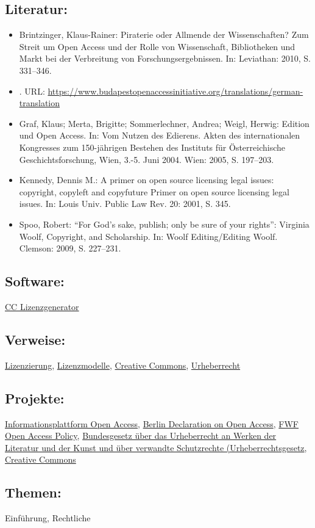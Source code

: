 \documentclass{article}
\begin{document}
        \subsection*{Literatur:}\begin{itemize}\item Brintzinger, Klaus-Rainer: Piraterie oder Allmende der Wissenschaften? Zum Streit um Open Access und der Rolle von Wissenschaft,  Bibliotheken und Markt bei der Verbreitung von  Forschungsergebnissen. In: Leviathan: 2010, S. 331–346.\item . URL: \url{https://www.budapestopenaccessinitiative.org/translations/german-translation}\item Graf, Klaus; Merta, Brigitte; Sommerlechner, Andrea; Weigl, Herwig: Edition und Open Access. In: Vom Nutzen des Edierens. Akten des internationalen Kongresses zum 150-jährigen Bestehen des Instituts für Österreichische Geschichtsforschung, Wien, 3.-5. Juni 2004. Wien: 2005, S. 197–203.\item Kennedy, Dennis M.: A primer on open source licensing legal issues: copyright, copyleft and copyfuture Primer on open source licensing legal issues. In: Louis Univ. Public Law Rev. 20: 2001, S. 345.\item Spoo, Robert: “For God’s sake, publish; only be sure of your rights”: Virginia Woolf, Copyright, and Scholarship. In: Woolf Editing/Editing Woolf. Clemson: 2009, S. 227–231.\end{itemize}\subsection*{Software:}\href{Vectr}{CC Lizenzgenerator}\subsection*{Verweise:}\href{https://gams.uni-graz.at/o:konde.119}{Lizenzierung}, \href{https://gams.uni-graz.at/o:konde.9}{Lizenzmodelle}, \href{https://gams.uni-graz.at/o:konde.45}{Creative Commons}, \href{https://gams.uni-graz.at/o:konde.44}{Urheberrecht}\subsection*{Projekte:}\href{https://open-access.net/}{Informationsplattform Open Access}, \href{http://www.berlin9.org/about/declaration/}{Berlin Declaration on Open Access}, \href{https://www.fwf.ac.at/de/forschungsfoerderung/open-access-policy/}{FWF Open Access Policy}, \href{https://www.ris.bka.gv.at/GeltendeFassung.wxe?Abfrage=Bundesnormen&Gesetzesnummer=10001848}{Bundesgesetz über das Urheberrecht an Werken der Literatur und der Kunst und über verwandte Schutzrechte (Urheberrechtsgesetz}, \href{https://creativecommons.org}{Creative Commons}\subsection*{Themen:}Einführung, Rechtliche 
\end{document}
